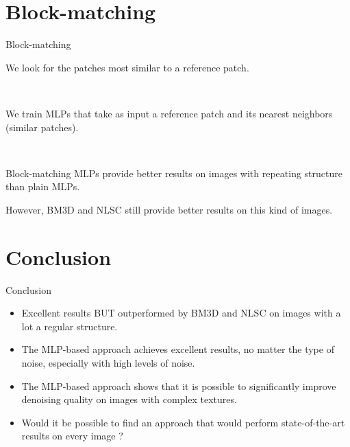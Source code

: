\documentclass[8pt]{beamer}
\begin{document}
\section{Block-matching}
\begin{frame}{Block-matching}
\begin{mybox}
We look for the patches most similar to a reference patch.
\end{mybox}\

\begin{mybox}
We train MLPs that take as input a reference patch and its nearest neighbors (similar patches).
\end{mybox}\

\begin{mybox}[Results]
Block-matching MLPs provide better results on images with repeating structure than plain MLPs.

\vspace{0.5em}
However, BM3D and NLSC still provide better results on this kind of images.
\end{mybox}
\end{frame}






\section{Conclusion}

\begin{frame}{Conclusion}
%
\begin{itemize}
	\item Excellent results BUT outperformed by BM3D and NLSC on images with a lot a regular structure.
	\item The MLP-based approach achieves excellent results, no matter the type of noise, especially with high levels of noise.
	\item The MLP-based approach shows that it is possible to significantly improve denoising quality on images with complex textures.
	\item Would it be possible to find an approach that would perform state-of-the-art results on every image ?
	
\end{itemize}

\end{frame}
\end{document}
